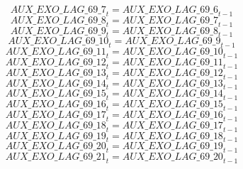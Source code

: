 \begin{dmath}
{AUX\_EXO\_LAG\_69\_7}_{t}={AUX\_EXO\_LAG\_69\_6}_{t-1}
\end{dmath}
\begin{dmath}
{AUX\_EXO\_LAG\_69\_8}_{t}={AUX\_EXO\_LAG\_69\_7}_{t-1}
\end{dmath}
\begin{dmath}
{AUX\_EXO\_LAG\_69\_9}_{t}={AUX\_EXO\_LAG\_69\_8}_{t-1}
\end{dmath}
\begin{dmath}
{AUX\_EXO\_LAG\_69\_10}_{t}={AUX\_EXO\_LAG\_69\_9}_{t-1}
\end{dmath}
\begin{dmath}
{AUX\_EXO\_LAG\_69\_11}_{t}={AUX\_EXO\_LAG\_69\_10}_{t-1}
\end{dmath}
\begin{dmath}
{AUX\_EXO\_LAG\_69\_12}_{t}={AUX\_EXO\_LAG\_69\_11}_{t-1}
\end{dmath}
\begin{dmath}
{AUX\_EXO\_LAG\_69\_13}_{t}={AUX\_EXO\_LAG\_69\_12}_{t-1}
\end{dmath}
\begin{dmath}
{AUX\_EXO\_LAG\_69\_14}_{t}={AUX\_EXO\_LAG\_69\_13}_{t-1}
\end{dmath}
\begin{dmath}
{AUX\_EXO\_LAG\_69\_15}_{t}={AUX\_EXO\_LAG\_69\_14}_{t-1}
\end{dmath}
\begin{dmath}
{AUX\_EXO\_LAG\_69\_16}_{t}={AUX\_EXO\_LAG\_69\_15}_{t-1}
\end{dmath}
\begin{dmath}
{AUX\_EXO\_LAG\_69\_17}_{t}={AUX\_EXO\_LAG\_69\_16}_{t-1}
\end{dmath}
\begin{dmath}
{AUX\_EXO\_LAG\_69\_18}_{t}={AUX\_EXO\_LAG\_69\_17}_{t-1}
\end{dmath}
\begin{dmath}
{AUX\_EXO\_LAG\_69\_19}_{t}={AUX\_EXO\_LAG\_69\_18}_{t-1}
\end{dmath}
\begin{dmath}
{AUX\_EXO\_LAG\_69\_20}_{t}={AUX\_EXO\_LAG\_69\_19}_{t-1}
\end{dmath}
\begin{dmath}
{AUX\_EXO\_LAG\_69\_21}_{t}={AUX\_EXO\_LAG\_69\_20}_{t-1}
\end{dmath}
